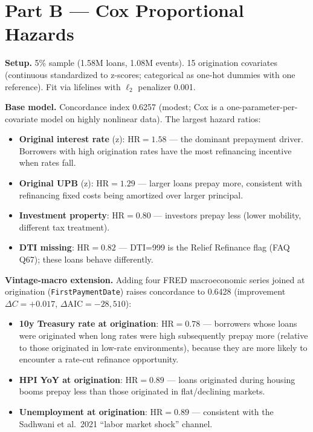 \documentclass[11pt,a4paper]{article}
\begin{document}
\section{Part B --- Cox Proportional Hazards}

\textbf{Setup.} 5\% sample (1.58M loans, 1.08M events). 15 origination covariates (continuous standardized to z-scores; categorical as one-hot dummies with one reference). Fit via lifelines with $\ell_2$ penalizer 0.001.

\textbf{Base model.} Concordance index 0.6257 (modest; Cox is a one-parameter-per-covariate model on highly nonlinear data). The largest hazard ratios:
\begin{itemize}[leftmargin=1.2em,itemsep=2pt,topsep=2pt]
  \item \textbf{Original interest rate} (z): $\text{HR} = 1.58$ --- the dominant prepayment driver. Borrowers with high origination rates have the most refinancing incentive when rates fall.
  \item \textbf{Original UPB} (z): $\text{HR} = 1.29$ --- larger loans prepay more, consistent with refinancing fixed costs being amortized over larger principal.
  \item \textbf{Investment property}: $\text{HR} = 0.80$ --- investors prepay less (lower mobility, different tax treatment).
  \item \textbf{DTI missing}: $\text{HR} = 0.82$ --- DTI=999 is the Relief Refinance flag (FAQ Q67); these loans behave differently.
\end{itemize}

\textbf{Vintage-macro extension.} Adding four FRED macroeconomic series joined at origination (\texttt{FirstPaymentDate}) raises concordance to 0.6428 (improvement $\Delta C = +0.017$, $\Delta\text{AIC} = -28{,}510$):
\begin{itemize}[leftmargin=1.2em,itemsep=2pt,topsep=2pt]
  \item \textbf{10y Treasury rate at origination}: $\text{HR} = 0.78$ --- borrowers whose loans were originated when long rates were high subsequently prepay more (relative to those originated in low-rate environments), because they are more likely to encounter a rate-cut refinance opportunity.
  \item \textbf{HPI YoY at origination}: $\text{HR} = 0.89$ --- loans originated during housing booms prepay less than those originated in flat/declining markets.
  \item \textbf{Unemployment at origination}: $\text{HR} = 0.89$ --- consistent with the Sadhwani et al.\ 2021 ``labor market shock'' channel.
\end{itemize}
\end{document}
